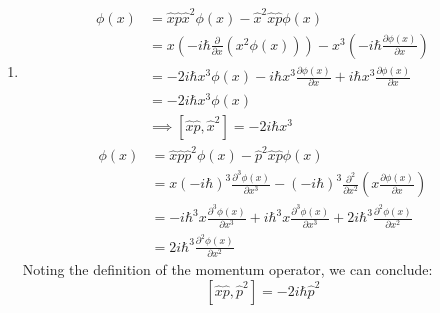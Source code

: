 \begin{sol}
\begin{enumerate}[label=\textbf{(\alph*)}]
\item
\begin{align*}
    [\hat{x}\hat{p}, \hat{x}^2]\phi(x) &= \hat{x}\hat{p}\hat{x}^2\phi(x) - \hat{x}^2\hat{x}\hat{p}\phi(x) \\ &= x\left(-i\hbar \frac{\partial}{\partial x}\left(x^2\phi(x)\right)\right) - x^3\left(-i\hbar\frac{\partial \phi(x)}{\partial x}\right) \\ &= -2i\hbar x^3\phi(x) -i\hbar x^3 \frac{\partial \phi(x)}{\partial x} + i\hbar x^3 \frac{\partial \phi(x)}{\partial x} \\ &= -2i\hbar x^3\phi(x) \\ &\implies  [\hat{x}\hat{p}, \hat{x}^2] = -2i\hbar x^3
\end{align*}
\begin{align*}
[\hat{x}\hat{p}, \hat{p}^2]\phi(x) &= \hat{x}\hat{p}\hat{p}^2\phi(x) - \hat{p}^2\hat{x}\hat{p}\phi(x) \\ &= x(-i\hbar)^3\frac{\partial^3 \phi(x)}{\partial x^3} - (-i\hbar)^3\frac{\partial^2}{\partial x^2}\left(x\frac{\partial \phi(x)}{\partial x}\right) \\ &= -i\hbar^3x \frac{\partial^3 \phi(x)}{\partial x^3} +  i\hbar^3x \frac{\partial^3 \phi(x)}{\partial x^3} + 2i\hbar^3\frac{\partial^2 \phi(x)}{\partial x^2} \\ &= 2i\hbar^3\frac{\partial^2 \phi(x)}{\partial x^2}
\end{align*}
Noting the definition of the momentum operator, we can conclude: $$[\hat{x}\hat{p}, \hat{p}^2] = -2i\hbar\hat{p}^2$$
\end{enumerate}
\end{sol}